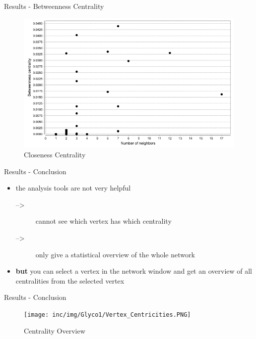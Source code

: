 \begin{frame}{Results - Betweenness Centrality}
	\begin{figure}
		\includegraphics[scale=0.4]{inc/img/Glyco1/BetweennessCentr.png}
	\caption{Closeness Centrality}
	\end{figure}
\end{frame}
\begin{frame}{Results - Conclusion}
	\begin{itemize}
		\item the analysis tools are not very helpful
		\begin{description}
			\item[-->] cannot see which vertex has which centrality
			\item[-->] only give a statistical overview of the whole network
		\end{description}
		\item \textbf{but} you can select a vertex in the network window and get an overview of all centralities from the selected vertex
	\end{itemize}
\end{frame}
\begin{frame}{Results - Conclusion}
	\begin{figure}
		\texttt{[image: inc/img/Glyco1/Vertex\_Centricities.PNG]}
	\caption{Centrality Overview}
	\end{figure}
\end{frame}